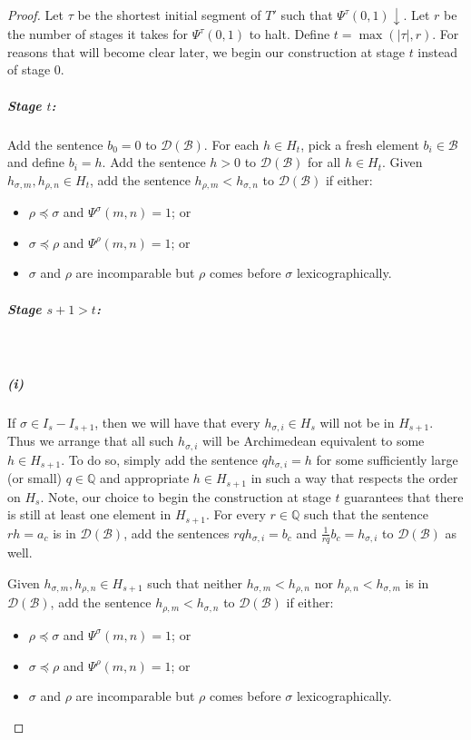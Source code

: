 \documentclass{amsart}%
\numberwithin{theorem}{section}
\newcommand{\Q}{\mathbb{Q}}
\newcommand{\B}{\mathcal{B}}
\newcommand{\D}{\mathcal{D}}
\newcommand{\0}{\emptyset}
\begin{document}
\begin{proof}
Let $\tau$ be the shortest initial segment of $T'$ such that $\Psi^\tau(0,1) \downarrow$. Let $r$ be the number of stages it takes for $\Psi^\tau(0,1)$ to halt. Define $t=\max(|\tau|,r)$. For reasons that will become clear later, we begin our construction at stage $t$ instead of stage $0$. \\

\subparagraph{Stage $t$:} Add the sentence $b_0=0$ to $\D(\B)$. For each $h \in H_t$, pick a fresh element $b_i \in \B$ and define $b_i=h$. Add the sentence $h>0$ to $\D(\B)$ for all $h\in H_t$. Given $h_{\sigma, m}, h_{\rho,n}\in H_t$, add the sentence $h_{\rho, m}< h_{\sigma,n}$ to $\D(\B)$ if either: 

\begin{itemize}
    \item $\rho \preceq \sigma $ and $\Psi^\sigma(m,n)=1$; or
    \item $\sigma \preceq \rho$ and $\Psi^\rho(m,n)=1$; or
    \item $\sigma$ and $\rho$ are incomparable but $\rho$ comes before $\sigma$ lexicographically.\\ 
\end{itemize}



\subparagraph{Stage $s+1>t$:}\,\\
\subparagraph{(i)} If $\sigma\in I_s - I_{s+1}$, then we will have that every $h_{\sigma,i}\in H_s$ will not be in $H_{s+1}$. Thus we arrange that all such $h_{\sigma,i}$ will be Archimedean equivalent to some $h\in H_{s+1}$. To do so, simply add the sentence $q h_{\sigma,i}= h$ for some sufficiently large (or small) $q\in \Q$ and appropriate $h\in H_{s+1}$ in such a way that respects the order on $H_s$. Note, our choice to begin the construction at stage $t$ guarantees that there is still at least one element in $H_{s+1}$. For every $r\in \Q$ such that the sentence $r h = a_c$ is in $\D(\B)$, add the sentences $rqh_{\sigma, i}=b_c$ and $\frac{1}{rq}b_c=h_{\sigma,i}$ to $\D(\B)$ as well. 

Given $h_{\sigma, m}, h_{\rho,n}\in H_{s+1}$ such that neither $h_{\sigma, m}< h_{\rho, n}$ nor $h_{\rho, n}<h_{\sigma, m}$ is in $\D(\B)$, add the sentence $h_{\rho, m}< h_{\sigma,n}$ to $\D(\B)$ if either: 

\begin{itemize}
    \item $\rho \preceq \sigma $ and $\Psi^\sigma(m,n)=1$; or
    \item $\sigma \preceq \rho$ and $\Psi^\rho(m,n)=1$; or
    \item $\sigma$ and $\rho$ are incomparable but $\rho$ comes before $\sigma$ lexicographically.\\ 
\end{itemize}


\end{proof}
\end{document}
